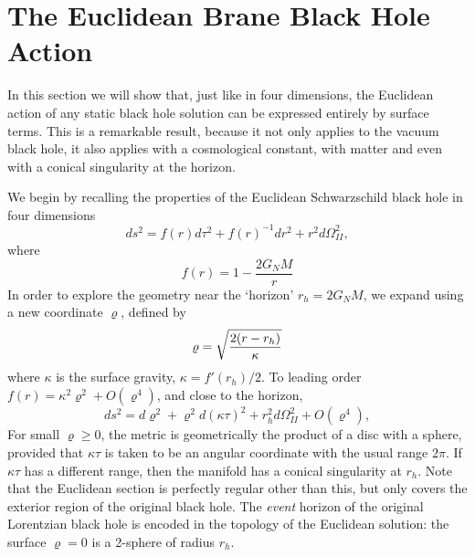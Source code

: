 \documentclass[aps,12pt,prd,superscriptaddress,preprintnumbers, 
	amssymb,
	amsmath,
	notitlepage,
	longbibliography,
	nofootinbib]{revtex4-1}
\begin{document}
\section{The Euclidean Brane Black Hole Action}
\label{sec:action}

In this section we will show that, just like in four dimensions, the 
Euclidean action of any static black hole solution can be expressed 
entirely by surface terms. This is a remarkable result, because it not 
only applies to the vacuum black hole, it also applies with a cosmological 
constant, with matter and even with a conical singularity at the horizon.

We begin by recalling the properties of the 
Euclidean Schwarzschild black hole in four dimensions
\begin{equation}
ds^2=f(r)d\tau^2+f(r)^{-1}dr^2+r^2d\Omega_{I\!I}^2,
\end{equation}
where 
\begin{equation}
f(r)=1-\frac{2G_NM}{r}
\end{equation}
In order to explore the geometry near the `horizon' $r_h=2G_NM$, 
we expand using a new coordinate ${\varrho}$, defined by
\begin{equation}
{\varrho}=\sqrt{{2(r-r_h)\over\kappa}}
\label{varrho4d}
\end{equation} 
where $\kappa$ is the surface gravity, $\kappa=f'(r_h)/2$.
To leading order $f(r)= \kappa^2{\varrho}^2+O({\varrho}^4)$, and
close to the horizon,
\begin{equation}
ds^2=d{\varrho}^2+{\varrho}^2d(\kappa\tau)^2
+r_h^2d\Omega_{I\!I}^2+O({\varrho}^4),
\end{equation}
For small ${\varrho}\ge 0$, the metric is geometrically the product of a 
disc with a sphere, provided that $\kappa\tau$ is taken to be an angular 
coordinate with the usual range $2\pi$. If $\kappa\tau$
has a different range, then the manifold has a conical singularity at 
$r_h$. Note that the Euclidean section is perfectly regular other than
this, but only covers the exterior region of the original black hole. 
The \emph{event} horizon of the original Lorentzian black hole is 
encoded in the topology of the Euclidean solution: the surface 
${\varrho}=0$ is a 2-sphere of radius $r_h$.
\end{document}
